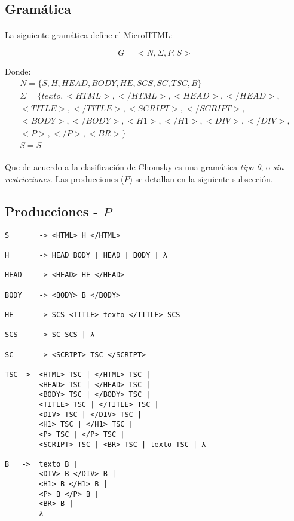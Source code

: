 \subsection{Gram\'atica}
\label{sec:gramatica}
\paragraph{} La siguiente gram\'atica define el MicroHTML:

\[
    G = <N, \Sigma, P, S>
\]

Donde:
\begin{gather*}
    N = \{S, H, HEAD, BODY, HE, SCS, SC, TSC, B\}\\
    \Sigma = \{texto, <HTML>, </HTML>, <HEAD>, </HEAD>, \\
               <TITLE>, </TITLE>, <SCRIPT>, </SCRIPT>, \\
               <BODY>, </BODY>, <H1>, </H1>, <DIV>, </DIV>,\\
               <P>, </P>, <BR>\}\\
    S = S
\end{gather*}

\paragraph{} Que de acuerdo a la clasificaci\'on de Chomsky es una gram\'atica \emph{tipo 0}, o \emph{sin restricciones}. Las producciones ($P$) se detallan en la siguiente subsecci\'on.

\subsection{Producciones - $P$}
\begin{lstlisting}
S       -> <HTML> H </HTML>
 
H       -> HEAD BODY | HEAD | BODY | λ   

HEAD    -> <HEAD> HE </HEAD>

BODY    -> <BODY> B </BODY>

HE      -> SCS <TITLE> texto </TITLE> SCS 

SCS     -> SC SCS | λ

SC      -> <SCRIPT> TSC </SCRIPT>

TSC ->  <HTML> TSC | </HTML> TSC | 
        <HEAD> TSC | </HEAD> TSC |
        <BODY> TSC | </BODY> TSC |
        <TITLE> TSC | </TITLE> TSC |
        <DIV> TSC | </DIV> TSC |
        <H1> TSC | </H1> TSC |
        <P> TSC | </P> TSC |
        <SCRIPT> TSC | <BR> TSC | texto TSC | λ

B   ->  texto B |
        <DIV> B </DIV> B |
        <H1> B </H1> B |
        <P> B </P> B |
        <BR> B |
        λ

\end{lstlisting}